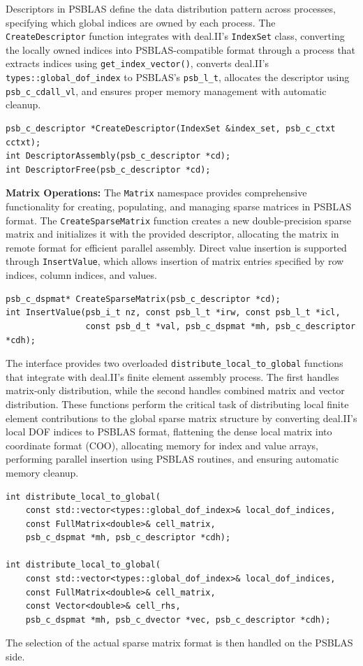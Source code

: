 \documentclass[a4paper,12pt]{article}
\begin{document}
Descriptors in PSBLAS define the data distribution pattern across processes, specifying which global 
indices are owned by each process. The \texttt{CreateDescriptor} function integrates 
with deal.II's \texttt{IndexSet} class, converting the locally owned indices into PSBLAS-compatible 
format through a process that extracts indices using \texttt{get\_index\_vector()}, converts 
deal.II's \texttt{types::global\_dof\_index} to PSBLAS's \texttt{psb\_l\_t}, allocates the descriptor 
using \texttt{psb\_c\_cdall\_vl}, and ensures proper memory management with automatic cleanup.
\begin{lstlisting}[caption=Descriptor management functions]
psb_c_descriptor *CreateDescriptor(IndexSet &index_set, psb_c_ctxt cctxt);
int DescriptorAssembly(psb_c_descriptor *cd);
int DescriptorFree(psb_c_descriptor *cd);
\end{lstlisting}

\textbf{Matrix Operations:} The \texttt{Matrix} namespace provides comprehensive functionality 
for creating, populating, and managing sparse matrices in PSBLAS format. The \texttt{CreateSparseMatrix} 
function creates a new double-precision sparse matrix and initializes it with the provided descriptor, 
allocating the matrix in remote format for efficient parallel assembly. Direct value insertion is 
supported through \texttt{InsertValue}, which allows insertion of matrix entries specified by 
row indices, column indices, and values.
\begin{lstlisting}[caption=Matrix creation and value insertion]
psb_c_dspmat* CreateSparseMatrix(psb_c_descriptor *cd);
int InsertValue(psb_i_t nz, const psb_l_t *irw, const psb_l_t *icl, 
                const psb_d_t *val, psb_c_dspmat *mh, psb_c_descriptor *cdh);
\end{lstlisting}

The interface provides two overloaded \texttt{distribute\_local\_to\_global} functions that 
integrate with deal.II's finite element assembly process. The first handles matrix-only 
distribution, while the second handles combined matrix and vector distribution. These 
functions perform the critical task of distributing local finite element contributions 
to the global sparse matrix structure by converting deal.II's local DOF indices to PSBLAS format, 
flattening the dense local matrix into coordinate format (COO), allocating memory for index 
and value arrays, performing parallel insertion using PSBLAS routines, and ensuring 
automatic memory cleanup.
\begin{lstlisting}[caption=Local-to-global distribution functions]
int distribute_local_to_global(
    const std::vector<types::global_dof_index>& local_dof_indices,
    const FullMatrix<double>& cell_matrix,
    psb_c_dspmat *mh, psb_c_descriptor *cdh);

int distribute_local_to_global(
    const std::vector<types::global_dof_index>& local_dof_indices,
    const FullMatrix<double>& cell_matrix,
    const Vector<double>& cell_rhs,
    psb_c_dspmat *mh, psb_c_dvector *vec, psb_c_descriptor *cdh);
\end{lstlisting}
The selection of the actual sparse matrix format is then handled on the PSBLAS side.
\end{document}
